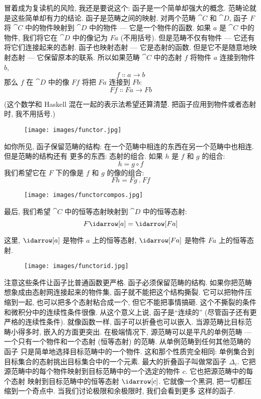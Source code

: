 
\lettrine[lhang=0.17]{冒}{着}成为复读机的风险, 我还是要说这个: 函子是一个简单却强大的概念.
范畴论就是这些简单却有力的结论. 函子是范畴之间的映射. 对两个范畴 $\cat{C}$ 和 $\cat{D}$,
函子 $F$ 将 $\cat{C}$ 中的物件映射到 $\cat{D}$ 中的物件 --- 它是一个物件的函数. 如果 $a$
是 $\cat{C}$ 中的物件, 我们将它在 $\cat{D}$ 中的像记为 $F a$ (不用括号). 但是范畴不仅有物件
--- 它还有将它们连接起来的态射. 函子也映射态射 --- 它是态射的函数. 但是它不是随意地映射态射
--- 它保留原本的联系. 所以如果范畴 $\cat{C}$ 中的态射 $f$ 将物件 $a$ 连接到物件 $b$,
\[f \Colon a \to b\]
那么 $f$ 在 $\cat{D}$ 中的像 $F f$ 将把 $F a$ 连接到 $F b$:
\[F f \Colon F a \to F b\]

(这个数学和 Haskell 混在一起的表示法希望还算清楚. 把函子应用到物件或者态射时, 我不用括号.)

\begin{figure}[H]
  \centering\texttt{[image: images/functor.jpg]}
\end{figure}

\noindent
如你所见, 函子保留范畴的结构: 在一个范畴中相连的东西在另一个范畴中也相连. 但是范畴的结构还有
更多的东西: 态射的组合. 如果 $h$ 是 $f$ 和 $g$ 的组合:
\[h = g \circ f\]
我们希望它在 $F$ 下的像是 $f$ 和 $g$ 的像的组合:
\[F h = F g~.~F f\]

\begin{figure}[H]
  \centering
  \texttt{[image: images/functorcompos.jpg]}
\end{figure}

\noindent
最后, 我们希望 $\cat{C}$ 中的恒等态射映射到 $\cat{D}$ 中的恒等态射:
\[F \idarrow[a] = \idarrow[F a]\]

\noindent
这里, $\idarrow[a]$ 是物件 $a$ 上的恒等态射, $\idarrow[F a]$ 是物件 $F a$ 上的恒等态射.

\begin{figure}[H]
  \centering
  \texttt{[image: images/functorid.jpg]}
\end{figure}

\noindent

注意这些条件让函子比普通函数更严格. 函子必须保留范畴的结构. 如果你把范畴想象成由态射网连接起来的物件集,
函子就不能把这个结构撕裂. 它可以把物件压缩到一起, 也可以把多个态射粘合成一个, 但它不能把事情搞砸.
这个不撕裂的条件和微积分中的连续性条件很像. 从这个意义上说, 函子是``连续的'' (尽管函子还有更严格的连续性条件).
就像函数一样, 函子可以折叠也可以嵌入. 当源范畴比目标范畴小得多时, 嵌入的方面更突出. 在极端情况下,
源范畴可以是平凡的单例范畴 --- 一个只有一个物件和一个态射 (恒等态射) 的范畴. 从单例范畴到任何其他范畴的函子
只是简单地选择目标范畴中的一个物件. 这和那个性质完全相同: 单例集合到目标集合的态射挑出目标集合中的一个元素.
最大的折叠函子叫做常函子 $\Delta_c$. 它把源范畴中的每个物件映射到目标范畴中的一个选定的物件 $c$. 它也把源范畴中的每个态射
映射到目标范畴中的恒等态射 $\idarrow[c]$. 它就像一个黑洞, 把一切都压缩到一个奇点中. 当我们讨论极限和余极限时, 我们会看到更多
这样的函子.

